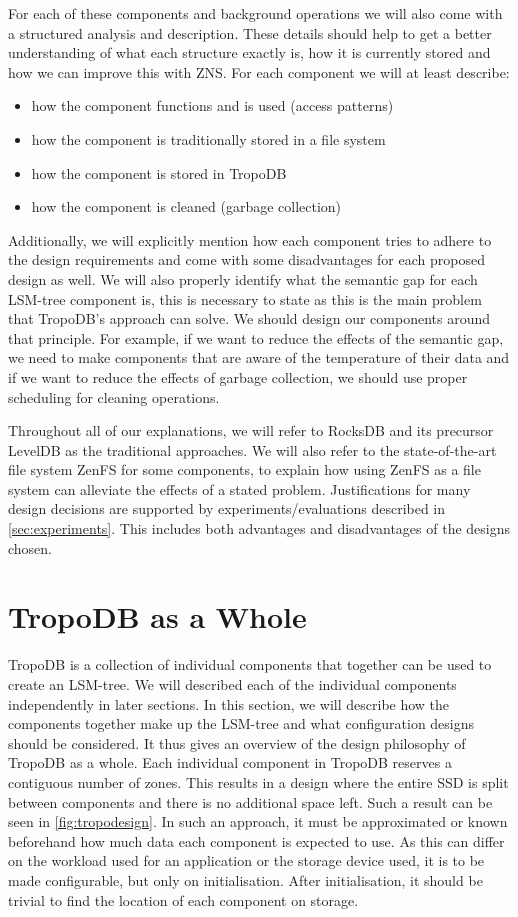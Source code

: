 For each of these components and background operations we will also come with a structured analysis and description. These details should help to get a better understanding of what each structure exactly is, how it is currently stored and how we can improve this with ZNS. For each component we will at least describe:
\begin{itemize}
    \item how the component functions and is used (access patterns)
    \item how the component is traditionally stored in a file system
    \item how the component is stored in TropoDB
    \item how the component is cleaned (garbage collection)
\end{itemize}
Additionally, we will explicitly mention how each component tries to adhere to the design requirements and come with some disadvantages for each proposed design as well. We will also properly identify what the semantic gap for each LSM-tree component is, this is necessary to state as this is the main problem that TropoDB's approach can solve. We should design our components around that principle. For example, if we want to reduce the effects of the semantic gap, we need to make components that are aware of the temperature of their data and if we want to reduce the effects of garbage collection, we should use proper scheduling for cleaning operations. 

Throughout all of our explanations, we will refer to RocksDB and its precursor LevelDB as the traditional approaches. We will also refer to the state-of-the-art file system ZenFS for some components, to explain how using ZenFS as a file system can alleviate the effects of a stated problem. Justifications for many design decisions are supported by experiments/evaluations described in \autoref{sec:experiments}. This includes both advantages and disadvantages of the designs chosen.


\section{TropoDB as a Whole}
TropoDB is a collection of individual components that together can be used to create an LSM-tree. We will described each of the individual components independently in later sections. In this section, we will describe how the components together make up the LSM-tree and what configuration designs should be considered. It thus gives an overview of the design philosophy of TropoDB as a whole. Each individual component in TropoDB reserves a contiguous number of zones. This results in a design where the entire SSD is split between components and there is no additional space left. Such a result can be seen in \autoref{fig:tropodesign}. In such an approach, it must be approximated or known beforehand how much data each component is expected to use. As this can differ on the workload used for an application or the storage device used, it is to be made configurable, but only on initialisation. After initialisation, it should be trivial to find the location of each component on storage.  

